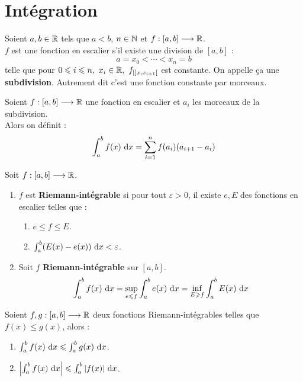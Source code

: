 \chapter{Intégration}
\def\arraystretch{1}

\begin{definition}
	Soient $a, b \in \mathbb{R}$ tels que $a < b$, $n \in \mathbb{N}$ et $f : [a, b] \longrightarrow \mathbb{R}$.
	\\
	$f$ est une fonction en escalier s'il existe une division de $[a, b]$ :
	\[ a = x_0 < \cdots < x_n = b \]
	telle que pour $0 \leqslant i \leqslant n,\ x_i \in \mathbb{R},\  f_{| ]x, x_{i+1}[}$ est constante. On appelle ça une \textbf{subdivision}.
	Autrement dit c'est une fonction constante par morceaux.
\end{definition}

\begin{definition}
	Soient $f : [a, b] \longrightarrow \mathbb{R}$ une fonction en escalier et $a_i$ les morceaux de la subdivision.
	\\
	Alors on définit :
	\[ \int_{a}^{b} f(x) \ \diffd x = \sum_{i = 1}^{n} f(a_i) (a_{i+1} - a_i) \]
\end{definition}

\begin{definition}
	Soit $f : [a, b] \longrightarrow \mathbb{R}$. 
	\begin{enumerate}
		\item $f$ est \textbf{Riemann-intégrable} si pour tout $\varepsilon > 0$, il existe $e, E$ des fonctions en escalier telles que :
		\begin{enumerate}
			\item $e \leq f \leq E$.
			\item $\int_{a}^{b} (E(x) - e(x)) \ \diffd x < \varepsilon$.
		\end{enumerate}
		\item Soit $f$ \textbf{Riemann-intégrable} sur $[a, b]$.
		\[ \int_{a}^{b} f(x) \ \diffd x = \underset{e \leq f}{\sup} \int_{a}^{b} e(x) \ \diffd x = \underset{E \geq f}{\inf} \int_{a}^{b} E(x) \ \diffd x \]
	\end{enumerate}
\end{definition}

\begin{lemma}
	Soient $f, g : [a, b] \longrightarrow \mathbb{R}$ deux fonctions Riemann-intégrables telles que $f(x) \leq g(x)$, alors :
	\begin{enumerate}
		\item $\int_{a}^{b} f(x) \ \diffd x \leq \int_{a}^{b} g(x) \ \diffd x$.
		\item $\abs{\int_{a}^{b} f(x) \ \diffd x} \leq \int_{a}^{b} \abs{f(x)} \ \diffd x$.
	\end{enumerate}
\end{lemma}

